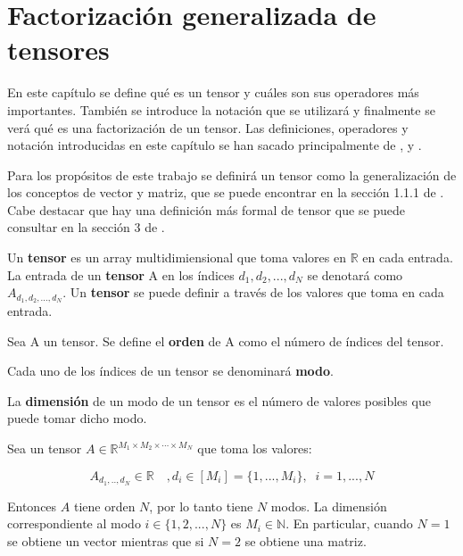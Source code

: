 \chapter{Factorización generalizada de tensores}
En este capítulo se define qué es un tensor y cuáles son sus operadores más importantes. También se introduce la notación que se utilizará y finalmente se verá qué es una factorización de un tensor. Las definiciones, operadores y notación introducidas en este capítulo se han sacado principalmente de \cite{DBLP:journals/corr/CohenS16}, \cite{libro} y \cite{doi:10.1137/07070111X}.

Para los propósitos de este trabajo se definirá un tensor como la generalización de los conceptos de vector y matriz, que se puede encontrar en la sección 1.1.1 de \cite{libro}. Cabe destacar que hay una definición más formal de tensor que se puede consultar en la sección 3 de \cite{libro}.

\begin{definicion}
Un \textbf{tensor} es un array multidimiensional que toma valores en $\mathbb{R}$ en cada entrada. La entrada de un \textbf{tensor} A en los índices $d_1,d_2,...,d_N$ se denotará como $A_{d_1,d_2,...,d_N}$. Un \textbf{tensor} se puede definir a través de los valores que toma en cada entrada.
\end{definicion}

\begin{definicion}
Sea A un tensor. Se define el \textbf{orden} de A como el número de índices del tensor. 
\end{definicion}

\begin{definicion}
Cada uno de los índices de un tensor se denominará \textbf{modo}. 
\end{definicion}

\begin{definicion}
La \textbf{dimensión} de un modo de un tensor es el número de valores posibles que puede tomar dicho modo.
\end{definicion}

Sea un tensor $A\in\mathbb{R}^{M_1\times M_2 \times \cdots \times M_N}$ que toma los valores:

$$ A_{d_1,..,d_N}\in\mathbb{R}\quad,d_i\in[M_i]=\{1,...,M_i\}, \;\; i=1,...,N
$$

Entonces $A$ tiene orden $N$, por lo tanto tiene $N$ modos. La dimensión correspondiente al modo $i\in\{1,2,...,N\}$ es $M_i\in\mathbb{N}$. En particular, cuando $N=1$ se obtiene un vector mientras que si $N=2$ se obtiene una matriz.

